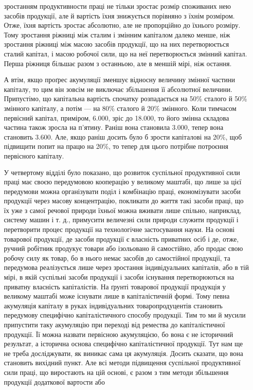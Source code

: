 \parcont{}  %
зростанням продуктивности праці не тільки зростає розмір споживаних
нею засобів продукції, але й вартість їхня знижується
порівняно з їхнім розміром. Отже, їхня вартість зростає абсолютно,
але не пропорційно до їхнього розміру. Тому зростання
ріжниці між сталим і змінним капіталом далеко менше, ніж зростання
ріжниці між масою засобів продукції, що на них перетворюється
сталий капітал, і масою робочої сили, що на неї перетворюється
змінний капітал. Перша ріжниця більшає разом з останньою,
але в меншій мірі, ніж остання.

А втім, якщо проґрес акумуляції зменшує відносну величину
змінної частини капіталу, то цим він зовсім не виключає збільшення
її абсолютної величини. Припустімо, що капітальна вартість спочатку
розпадається на 50\% сталого й 50\% змінного капіталу,
а потім — на 80\% сталого й 20\% змінного. Коли тимчасом первісний
капітал, приміром, 6.000, зріс до 18.000, то його змінна складова частина також зросла
на п’ятину. Раніш вона становила 3.000, тепер
вона становить 3.600. Але, якщо раніш
досить було б зрости капіталові на 20\%, щоб підвищити попит
на працю на 20\%, то тепер для цього потрібне потроєння первісного
капіталу.

У четвертому відділі було показано, що розвиток суспільної
продуктивної сили праці має своєю передумовою кооперацію у
великому маштабі, що лише за цієї передумови можна організувати
поділ і комбінацію праці, економізувати засоби продукції
через масову концентрацію, покликати до життя такі засоби
праці, що їх уже з самої речової природи їхньої можна вживати
лише спільно, наприклад, систему машин і т. д., примусити величезні
сили природи служити продукції і перетворити процес продукції
на технологічне застосування науки. На основі товарової
продукції, де засоби продукції є власність приватних осіб і де,
отже, ручний робітник продукує товари або ізольовано й самостійно,
або продає свою робочу силу як товар, бо в нього немає
засобів до самостійної продукції, та передумова реалізується
лише через зростання індивідуальних капіталів, або в тій мірі,
в якій суспільні засоби продукції і засоби існування перетворюються
на приватну власність капіталістів. На ґрунті товарової
продукції продукція у великому маштабі може існувати лише в
капіталістичній формі. Тому певна акумуляція капіталу в руках
індивідуальних товаропродуцентів становить передумову специфічно
капіталістичного способу продукції. Тим то ми й мусили
припустити таку акумуляцію при переході від ремества до капіталістичної
продукції. Її можна назвати первісною акумуляцією,
бо вона є не історичний результат, а історична основа специфічно
капіталістичної продукції. Тут нам ще не треба досліджувати,
як виникає сама ця акумуляція. Досить сказати, що вона становить
вихідний пункт. Але всі методи підвищення суспільної
продуктивної сили праці, що виростають на цій основі, є разом
з тим методи збільшення продукції додаткової вартости або
\parbreak{}  %
